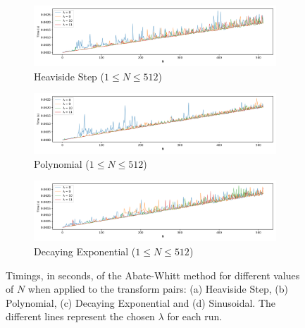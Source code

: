 \documentclass[a4paper]{report}
\begin{document}
\begin{figure}[H]
    \begin{subfigure}{1\linewidth}
      \includegraphics[width=\linewidth]{images/abate_whitt/heaviside_speed.png}
      \caption{Heaviside Step ($1 \leq N \leq 512$)}
    \end{subfigure}
    
    \medskip
    
    \begin{subfigure}{1\linewidth}
      \includegraphics[width=\linewidth]{images/abate_whitt/polynomial_speed.png}
      \caption{Polynomial ($1 \leq N \leq 512$)}
    \end{subfigure}
    
    \medskip
    
    \begin{subfigure}{1\linewidth}
      \includegraphics[width=\linewidth]{images/abate_whitt/decay_exp_speed.png}
      \caption{Decaying Exponential ($1 \leq N \leq 512$)}
    \end{subfigure}
    
    \caption{Timings, in seconds, of the Abate-Whitt method for different values of $N$ when applied to the transform pairs: (a) Heaviside Step, (b) Polynomial, (c) Decaying Exponential and (d) Sinusoidal. The different lines represent the chosen $\lambda$ for each run.}
    \label{fig:timings_abate_whitt}
\end{figure}
\end{document}
